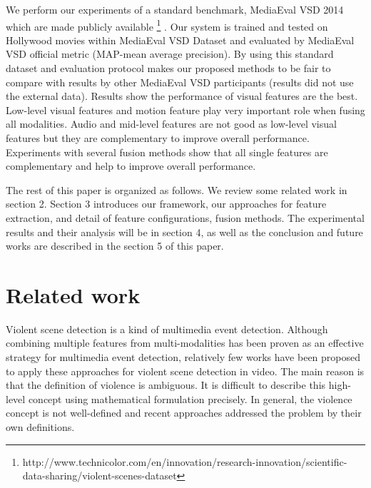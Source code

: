 \documentclass[review]{elsarticle}
\begin{document}
We perform our experiments of a standard benchmark, MediaEval VSD 2014\cite{demarty2014benchmarking} which are made publicly available \footnote{http://www.technicolor.com/en/innovation/research-innovation/scientific-data-sharing/violent-scenes-dataset} . Our system is trained and tested on Hollywood movies within MediaEval VSD Dataset and evaluated by MediaEval VSD official metric (MAP-mean average precision). By using this standard dataset and evaluation protocol makes our proposed methods to be fair to compare with results by other MediaEval VSD participants (results did not use the external data). Results show the performance of visual features are the best. Low-level visual features and motion feature play very important role when fusing all modalities. Audio and mid-level features are not good as low-level visual features but they are complementary to improve overall performance. Experiments with several fusion methods show that all single features are complementary and help to improve overall performance.

The rest of this paper is organized as follows. We review some related work in section 2. Section 3 introduces our framework, our approaches for feature extraction, and detail of feature configurations, fusion methods. The experimental results and their analysis will be in section 4, as well as the conclusion and future works are described in the section 5 of this paper.
\section{Related work}
Violent scene detection is a kind of multimedia event detection. Although combining multiple features from multi-modalities has been proven as an effective strategy for multimedia event detection, relatively few works have been proposed to apply these approaches for violent scene detection in video. The main reason is that the definition of violence is ambiguous. It is difficult to describe this high-level concept using mathematical formulation precisely. In general, the violence concept is not well-defined and recent approaches addressed the problem by their own definitions.
\end{document}
